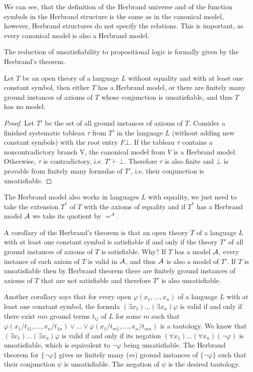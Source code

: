 We can see, that the definition of the Herbrand universe and of the function symbols in the Herbrand structure is the same as in the canonical model, however, Herbrand structures do not specify the relations. This is important, as every canonical model is also a Herbrand model.

The reduction of unsatisfiability to propositional logic is formally given by the Herbrand's theorem.

\begin{theorem}[Herbrand]
Let $T$ be an open theory of a language $L$ without equality and with at least one constant symbol, then either $T$ has a Herbrand model, or there are finitely many ground instances of axioms of $T$ whose conjunction is unsatisfiable, and thus $T$ has no model.
\end{theorem}
\begin{proof}
Let $T'$ be the set of all ground instances of axioms of $T$. Consider a finished systematic tableau $\tau$ from $T'$ in the language $L$ (without adding new constant symbols) with the root entry $F \bot$. If the tableau $\tau$ contains a noncontradictory branch V, the canonical model from $V$ is a Herbrand model. Otherwise, $\tau$ is contradictory, i.e. $T' \vdash \bot$. Therefore $\tau$ is also finite and $\bot$ is provable from finitely many formulas of $T'$, i.e. their conjunction is unsatisfiable.
\end{proof}

The Herbrand model also works in languages $L$ with equality, we just need to take the extension $T^*$ of $T$ with the axioms of equality and if $T^*$ has a Herbrand model $\mathcal{A}$ we take its quotient by $=^A$.

A corollary of the Herbrand's theorem is that an open theory $T$ of a language $L$ with at least one constant symbol is satisfiable if and only if the theory $T'$ of all ground instances of axioms of $T$ is satisfiable. Why? If $T$ has a model $\mathcal{A}$, every instance of each axiom of $T$ is valid in $\mathcal{A}$, and thus $\mathcal{A}$ is also a model of $T'$. If $T$ is unsatisfiable then by Herbrand theorem there are finitely ground instances of axioms of $T$ that are not satisfiable and therefore $T'$ is also unsatisfiable.

Another corollary says that for every open $\varphi(x_1, \dots, x_n)$ of a language $L$ with at least one constant symbol, the formula $(\exists x_1)\dots(\exists x_n)\varphi$ is valid if and only if there exist $mn$ ground terms $t_{ij}$ of $L$ for some $m$ such that $\varphi(x_1/t_{11}, \dots, x_n/t_{1n}) \lor \dots \lor \varphi(x_1/t_{m1}, \dots, x_n/t_{mn})$ is a tautology. We know that $(\exists x_1)\dots(\exists x_n)\varphi$ is valid if and only if its negation $(\forall x_1)\dots(\forall x_n)(\neg\varphi)$ is unsatisfiable, which is equivalent to $\neg \varphi$ being unsatisfiable. The Herbrand theorem for $\{\neg \varphi\}$ gives us finitely many ($m$) ground instances of $\{\neg \varphi\}$ such that their conjunction $\psi$ is unsatisfiable. The negation of $\psi$ is the desired tautology.

